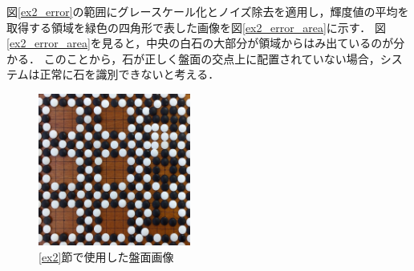 \documentclass[summary]{nitocs}
\numberwithin{equation}{section}
\begin{document}
            図\ref{ex2_error}の範囲にグレースケール化とノイズ除去を適用し，輝度値の平均を取得する領域を緑色の四角形で表した画像を図\ref{ex2_error_area}に示す．
            図\ref{ex2_error_area}を見ると，中央の白石の大部分が領域からはみ出ているのが分かる．
            このことから，石が正しく盤面の交点上に配置されていない場合，システムは正常に石を識別できないと考える．
            
            \begin{figure}[tb] %
                \begin{center}
                \includegraphics[clip,width=50mm]{DSC_0099/boardImg.jpg} 
                \caption{\ref{ex2}節で使用した盤面画像}
                \label{ex2_img}
                \end{center}
            \end{figure}
\end{document}
